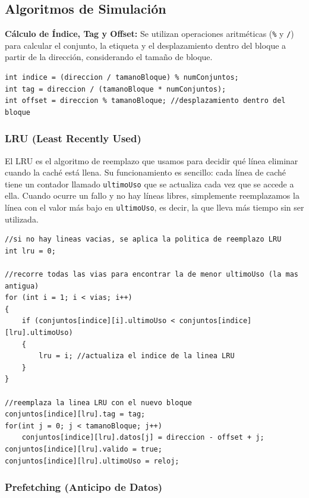\documentclass[14pt]{article}
\begin{document}
\subsection*{Algoritmos de Simulación}

\textbf{Cálculo de Índice, Tag y Offset:} Se utilizan operaciones aritméticas (\texttt{\%} y \texttt{/}) para calcular el conjunto, la etiqueta y el desplazamiento dentro del bloque a partir de la dirección, considerando el tamaño de bloque.

\begin{lstlisting}
int indice = (direccion / tamanoBloque) % numConjuntos;
int tag = direccion / (tamanoBloque * numConjuntos);
int offset = direccion % tamanoBloque; //desplazamiento dentro del bloque
\end{lstlisting}

\subsubsection*{LRU (Least Recently Used)}

El LRU es el algoritmo de reemplazo que usamos para decidir qué línea eliminar cuando la caché está llena. Su funcionamiento es sencillo: cada línea de caché tiene un contador llamado \texttt{ultimoUso} que se actualiza cada vez que se accede a ella. Cuando ocurre un fallo y no hay líneas libres, simplemente reemplazamos la línea con el valor más bajo en \texttt{ultimoUso}, es decir, la que lleva más tiempo sin ser utilizada.

\begin{lstlisting}
//si no hay lineas vacias, se aplica la politica de reemplazo LRU
int lru = 0;

//recorre todas las vias para encontrar la de menor ultimoUso (la mas antigua)
for (int i = 1; i < vias; i++)
{
    if (conjuntos[indice][i].ultimoUso < conjuntos[indice][lru].ultimoUso)
    {
        lru = i; //actualiza el indice de la linea LRU
    }
}

//reemplaza la linea LRU con el nuevo bloque
conjuntos[indice][lru].tag = tag;
for(int j = 0; j < tamanoBloque; j++)
    conjuntos[indice][lru].datos[j] = direccion - offset + j;
conjuntos[indice][lru].valido = true;
conjuntos[indice][lru].ultimoUso = reloj;
\end{lstlisting}

\subsubsection*{Prefetching (Anticipo de Datos)}
\end{document}

